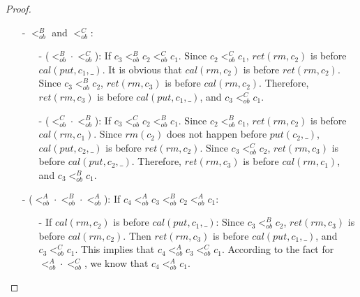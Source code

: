 \documentclass{llncs}
\begin{document}
\begin {proof}
\begin{itemize}
\begin{itemize}
    \item[-] ($<_{\textit{ob}}^C \cdot <_{\textit{ob}}^A$): If $c_3 <_{\textit{ob}}^C c_2 <_{\textit{ob}}^A c_1$. Since $c_2 <_{\textit{ob}}^A c_1$, $\textit{put}(c_2,\_)$ happens before $\textit{put}(c_1,\_)$. Since $c_3 <_{\textit{ob}}^C c_2$, $\textit{rm}(c_3)$ happens before $\textit{put}(c_2,\_)$. Therefore, $\textit{rm}(c_3)$ happens before $\textit{put}(c_1,\_)$, and $c_3 <_{\textit{ob}}^C c_1$.
    \end{itemize}

\item[-] $<_{\textit{ob}}^B$ and $<_{\textit{ob}}^C$:

    \begin{itemize}
    \setlength{\itemsep}{0.5pt}
    \item[-] ($<_{\textit{ob}}^B \cdot <_{\textit{ob}}^C$): If $c_3 <_{\textit{ob}}^B c_2 <_{\textit{ob}}^C c_1$. Since $c_2 <_{\textit{ob}}^C c_1$, $\textit{ret}(\textit{rm},c_2)$ is before $\textit{cal}(\textit{put},c_1,\_)$. It is obvious that $\textit{cal}(\textit{rm},c_2)$ is before $\textit{ret}(\textit{rm},c_2)$. Since $c_3 <_{\textit{ob}}^B c_2$, $\textit{ret}(\textit{rm},c_3)$ is before $\textit{cal}(\textit{rm},c_2)$. Therefore, $\textit{ret}(\textit{rm},c_3)$ is before $\textit{cal}(\textit{put},c_1,\_)$, and $c_3 <_{\textit{ob}}^C c_1$.

    \item[-] ($<_{\textit{ob}}^C \cdot <_{\textit{ob}}^B$): If $c_3 <_{\textit{ob}}^C c_2 <_{\textit{ob}}^B c_1$. Since $c_2 <_{\textit{ob}}^B c_1$, $\textit{ret}(\textit{rm},c_2)$ is before $\textit{cal}(\textit{rm},c_1)$. Since $\textit{rm}(c_2)$ does not happen before $\textit{put}(c_2,\_)$, $\textit{cal}(\textit{put},c_2,\_)$ is before $\textit{ret}(\textit{rm},c_2)$. Since $c_3 <_{\textit{ob}}^C c_2$, $\textit{ret}(\textit{rm},c_3)$ is before $\textit{cal}(\textit{put},c_2,\_)$. Therefore, $\textit{ret}(\textit{rm},c_3)$ is before $\textit{cal}(\textit{rm},c_1)$, and $c_3 <_{\textit{ob}}^B c_1$.
    \end{itemize}

\item[-]  ($<_{\textit{ob}}^A \cdot <_{\textit{ob}}^B \cdot <_{\textit{ob}}^A$): If $c_4 <_{\textit{ob}}^A c_3 <_{\textit{ob}}^B c_2 <_{\textit{ob}}^A c_1$:
    \begin{itemize}
    \setlength{\itemsep}{0.5pt}
    \item[-] If $\textit{cal}(\textit{rm},c_2)$ is before $\textit{cal}(\textit{put},c_1,\_)$: Since $c_3 <_{\textit{ob}}^B c_2$, $\textit{ret}(\textit{rm},c_3)$ is before $\textit{cal}(\textit{rm},c_2)$. Then $\textit{ret}(\textit{rm},c_3)$ is before $\textit{cal}(\textit{put},c_1,\_)$, and $c_3 <_{\textit{ob}}^C c_1$. This implies that $c_4 <_{\textit{ob}}^A c_3 <_{\textit{ob}}^C c_1$. According to the fact for $<_{\textit{ob}}^A \cdot <_{\textit{ob}}^C$, we know that $c_4  <_{\textit{ob}}^A c_1$.


\end{itemize}
\end{itemize}
\end{proof}
\end{document}
